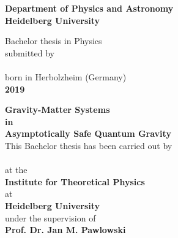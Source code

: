 {\hypersetup{allcolors=black}
\begin{titlepage}

	\begin{center}
		\makeatletter
		\vspace{2cm}
		\Large\textbf{Department of Physics and Astronomy\\
			Heidelberg University}
		
		\vfill
		\normalsize
		Bachelor thesis in Physics\\
		\normalsize
		submitted by\\[0.4cm]
		\Large
		\textbf{\@author}\\[0.4cm]
		\normalsize
		born in Herbolzheim (Germany) \\ [0.4cm]
		\Large\textbf{2019}

		\cleardoublepage
		\thispagestyle{empty}
		\LARGE\textbf{Gravity-Matter Systems \\ in \\
		Asymptotically Safe Quantum Gravity}\\[.4cm]

		\vfill
		\normalsize
		This Bachelor thesis has been carried out by \\ 
		\vspace{3pt}
		\textbf{\@author}  \\ 
		\vspace{3pt}
		at the\\
		\vspace{3pt}
		\textbf{Institute for Theoretical Physics} \\ at \\\textbf{Heidelberg University}\\
		\vspace{5pt}
		under the supervision of\\
		\vspace{5pt}
		\textbf{Prof. Dr. Jan M. Pawlowski}
		
		\makeatother
	\end{center}
\cleardoublepage
\end{titlepage}}